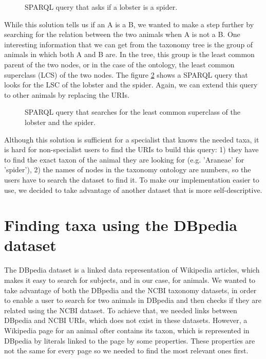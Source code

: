 \documentclass{article}
\begin{document}
	\begin{figure}[h]
		
		\caption{SPARQL query that asks if a lobster is a spider.}
		\label{lst:sparql_subClassOf}
	\end{figure}
	
	While this solution tells us if an A is a B, we wanted to make a step further by searching for the relation between the two animals when A is not a B. One interesting information that we can get from the taxonomy tree is the group of animals in which both A and B are. In the tree, this group is the least common parent of the two nodes, or in the case of the ontology, the least common superclass (LCS) of the two nodes. The figure \ref{lst:sparql_lcs} shows a SPARQL query that looks for the LSC of the lobster and the spider. Again, we can extend this query to other animals by replacing the URIs.
	
	\begin{figure}[h]
		
		\caption{SPARQL query that searches for the least common superclass of the lobster and the spider.}
		\label{lst:sparql_lcs}
	\end{figure}
	
	Although this solution is sufficient for a specialist that knows the needed taxa, it is hard for non-specialist users to find the URIs to build this query: 1) they have to find the exact taxon of the animal they are looking for (e.g. 'Araneae' for 'spider'), 2) the names of nodes in the taxonomy ontology are numbers, so the users have to search the dataset to find it. To make our implementation easier to use, we decided to take advantage of another dataset that is more self-descriptive.
	
	\section{Finding taxa using the DBpedia dataset}
	
	The DBpedia dataset is a linked data representation of Wikipedia articles, which makes it easy to search for subjects, and in our case, for animals. We wanted to take advantage of both the DBpedia and the NCBI taxonomy datasets, in order to enable a user to search for two animals in DBpedia and then checks if they are related using the NCBI dataset. To achieve that, we needed links between DBpedia and NCBI URIs, which does not exist in these datasets. However, a Wikipedia page for an animal ofter contains its taxon, which is represented in DBpedia by literals linked to the page by some properties. These properties are not the same for every page so we needed to find the most relevant ones first.
	\\
	
\end{document}
